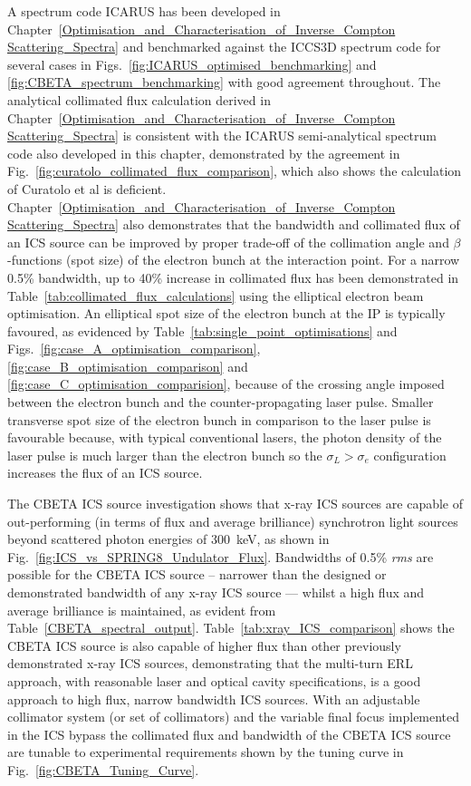 \documentclass[../main.tex]{subfiles}
\begin{document}
A spectrum code \textsc{ICARUS} has been developed in Chapter~\ref{Optimisation_and_Characterisation_of_Inverse_Compton Scattering_Spectra} and benchmarked against the \textsc{ICCS3D} spectrum code for several cases in Figs.~\ref{fig:ICARUS_optimised_benchmarking} and \ref{fig:CBETA_spectrum_benchmarking} with good agreement throughout. The analytical collimated flux calculation derived in Chapter~\ref{Optimisation_and_Characterisation_of_Inverse_Compton Scattering_Spectra} is consistent with the \textsc{ICARUS} semi-analytical spectrum code also developed in this chapter, demonstrated by the agreement in Fig.~\ref{fig:curatolo_collimated_flux_comparison}, which also shows the calculation of Curatolo et al \cite{curatolo2017analytical} is deficient. Chapter~\ref{Optimisation_and_Characterisation_of_Inverse_Compton Scattering_Spectra} also demonstrates that the bandwidth and collimated flux of an ICS source can be improved by proper trade-off of the collimation angle and $\beta$-functions (spot size) of the electron bunch at the interaction point. For a narrow 0.5\% bandwidth, up to 40\% increase in collimated flux has been demonstrated in Table~\ref{tab:collimated_flux_calculations} using the elliptical electron beam optimisation. An elliptical spot size of the electron bunch at the IP is typically favoured, as evidenced by Table~\ref{tab:single_point_optimisations} and Figs.~\ref{fig:case_A_optimisation_comparison}, \ref{fig:case_B_optimisation_comparison} and \ref{fig:case_C_optimisation_comparision}, because of the crossing angle imposed between the electron bunch and the counter-propagating laser pulse. Smaller transverse spot size of the electron bunch in comparison to the laser pulse is favourable because, with typical conventional lasers, the photon density of the laser pulse is much larger than the electron bunch so the $\sigma_{L}>\sigma_{e}$ configuration increases the flux of an ICS source. 

The CBETA ICS source investigation shows that x-ray ICS sources are capable of out-performing (in terms of flux and average brilliance) synchrotron light sources beyond scattered photon energies of 300~\si{\kilo\electronvolt}, as shown in Fig.~\ref{fig:ICS_vs_SPRING8_Undulator_Flux}. Bandwidths of 0.5\% \textit{rms} are possible for the CBETA ICS source -- narrower than the designed or demonstrated bandwidth of any x-ray ICS source --- whilst a high flux and average brilliance is maintained, as evident from Table~\ref{CBETA_spectral_output}. Table~\ref{tab:xray_ICS_comparison} shows the CBETA ICS source is also capable of higher flux than other previously demonstrated x-ray ICS sources, demonstrating that the multi-turn ERL approach, with reasonable laser and optical cavity specifications, is a good approach to high flux, narrow bandwidth ICS sources. With an adjustable collimator system (or set of collimators) and the variable final focus implemented in the ICS bypass the collimated flux and bandwidth of the CBETA ICS source are tunable to experimental requirements shown by the tuning curve in Fig.~\ref{fig:CBETA_Tuning_Curve}.   
\end{document}
